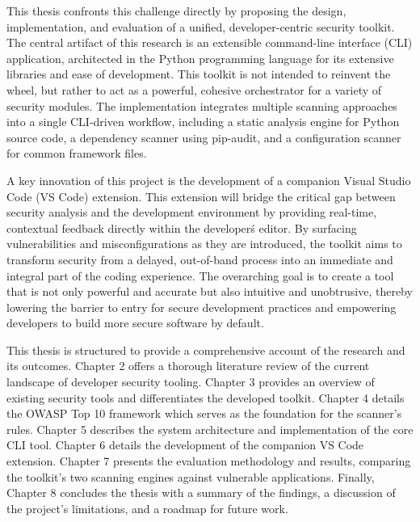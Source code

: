 This thesis confronts this challenge directly by proposing the design, implementation, and evaluation of a unified, developer-centric security toolkit. The central artifact of this research is an extensible command-line interface (CLI) application, architected in the Python programming language for its extensive libraries and ease of development. This toolkit is not intended to reinvent the wheel, but rather to act as a powerful, cohesive orchestrator for a variety of security modules. The implementation integrates multiple scanning approaches into a single CLI-driven workflow, including a static analysis engine for Python source code, a dependency scanner using pip-audit, and a configuration scanner for common framework files.

A key innovation of this project is the development of a companion Visual Studio Code (VS Code) extension. This extension will bridge the critical gap between security analysis and the development environment by providing real-time, contextual feedback directly within the developer\'s editor. By surfacing vulnerabilities and misconfigurations as they are introduced, the toolkit aims to transform security from a delayed, out-of-band process into an immediate and integral part of the coding experience. The overarching goal is to create a tool that is not only powerful and accurate but also intuitive and unobtrusive, thereby lowering the barrier to entry for secure development practices and empowering developers to build more secure software by default.

This thesis is structured to provide a comprehensive account of the research and its outcomes. Chapter 2 offers a thorough literature review of the current landscape of developer security tooling. Chapter 3 provides an overview of existing security tools and differentiates the developed toolkit. Chapter 4 details the OWASP Top 10 framework which serves as the foundation for the scanner's rules. Chapter 5 describes the system architecture and implementation of the core CLI tool. Chapter 6 details the development of the companion VS Code extension. Chapter 7 presents the evaluation methodology and results, comparing the toolkit's two scanning engines against vulnerable applications. Finally, Chapter 8 concludes the thesis with a summary of the findings, a discussion of the project's limitations, and a roadmap for future work.